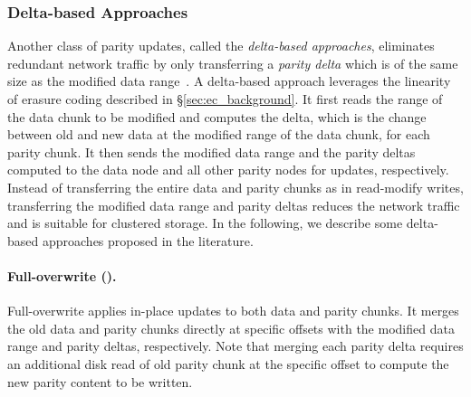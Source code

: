 \subsubsection{Delta-based Approaches}
\label{sec:delta_based}

Another class of parity updates, called the {\em delta-based approaches}, 
eliminates redundant network traffic by only transferring a {\em parity delta}
which is of the same size as the modified data range~\cite{cao94,storer08}.  A
delta-based approach
leverages the linearity of erasure coding described in
\S\ref{sec:ec_background}. It first reads the range of the data chunk to be
modified and computes the delta, which is the change between old and new data at the modified 
range of the data chunk, for each parity chunk. It then sends the
modified data range and the parity deltas computed to the data node and all
other parity nodes for updates, respectively. 
Instead of transferring the entire data and parity chunks as in
read-modify writes, transferring the modified data range and parity deltas
reduces the
network traffic and is suitable for clustered storage.  In the following, we
describe some delta-based approaches proposed in the literature. 



\paragraph{Full-overwrite (\FO).} Full-overwrite
\cite{aguilera05} applies in-place updates
to both data and parity chunks. It merges the old data and parity chunks
directly at specific offsets with the modified data range and parity deltas,
respectively. Note that merging each parity delta requires an additional disk read of
old parity chunk at the specific offset to compute the new parity content to be
written.

